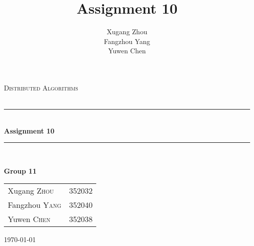 \documentclass[a4paper, 14pt]{article}
\title{\bf Assignment 10}
\author{Xugang Zhou \\ Fangzhou Yang \\ Yuwen Chen}
\newcommand{\HRule}{\rule{\linewidth}{0.5mm}}
\begin{document}
\begin{titlepage}
\begin{center}
\vfill
\textsc{\LARGE Distributed Algorithms}\\[1.5cm]
\textsc{\Large }\\[0.5cm]

\HRule \\[0.4cm]
{\huge \bfseries Assignment 10}\\[0.4cm]
\HRule \\[1.5cm]
\begin{minipage}{0.4\textwidth}
\begin{flushleft} \large
\large{\textbf{Group 11}}
\end{flushleft}
\end{minipage}
\begin{minipage}{0.4\textwidth}
\begin{flushright} \large
\begin{tabular}{ll}
Xugang \textsc{Zhou} & 352032\\
Fangzhou \textsc{Yang} & 352040\\
Yuwen \textsc{Chen} & 352038
\end{tabular}
\end{flushright}
\end{minipage}
\vfill
{\large \today}\\
\end{center}
\end{titlepage}
\thispagestyle{fancy}
\end{document}
